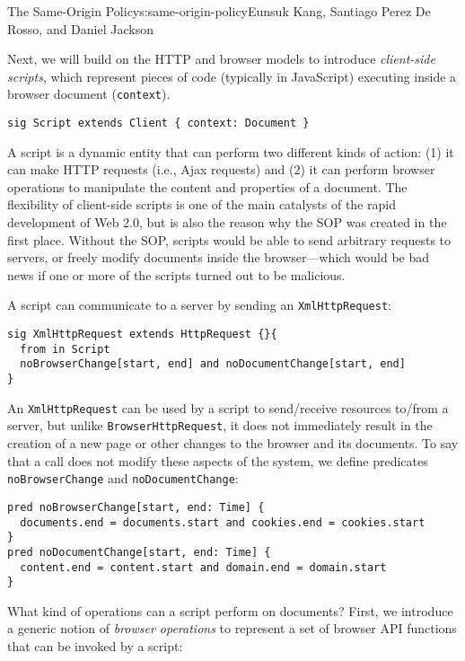 \begin{aosachapter}{The Same-Origin Policy}{s:same-origin-policy}{Eunsuk Kang, Santiago Perez De Rosso, and Daniel Jackson}
\label{script}

Next, we will build on the HTTP and browser models to introduce
\emph{client-side scripts}, which represent pieces of code (typically in
JavaScript) executing inside a browser document (\texttt{context}).

\begin{verbatim}
sig Script extends Client { context: Document }
\end{verbatim}

A script is a dynamic entity that can perform two different kinds of
action: (1) it can make HTTP requests (i.e., Ajax requests) and (2) it
can perform browser operations to manipulate the content and properties
of a document. The flexibility of client-side scripts is one of the main
catalysts of the rapid development of Web 2.0, but is also the reason
why the SOP was created in the first place. Without the SOP, scripts
would be able to send arbitrary requests to servers, or freely modify
documents inside the browser---which would be bad news if one or more of
the scripts turned out to be malicious.

A script can communicate to a server by sending an
\texttt{XmlHttpRequest}:

\begin{verbatim}
sig XmlHttpRequest extends HttpRequest {}{
  from in Script
  noBrowserChange[start, end] and noDocumentChange[start, end]
}
\end{verbatim}

An \texttt{XmlHttpRequest} can be used by a script to send/receive
resources to/from a server, but unlike \texttt{BrowserHttpRequest}, it
does not immediately result in the creation of a new page or other
changes to the browser and its documents. To say that a call does not
modify these aspects of the system, we define predicates
\texttt{noBrowserChange} and \texttt{noDocumentChange}:

\begin{verbatim}
pred noBrowserChange[start, end: Time] {
  documents.end = documents.start and cookies.end = cookies.start  
}
pred noDocumentChange[start, end: Time] {
  content.end = content.start and domain.end = domain.start  
}
\end{verbatim}

What kind of operations can a script perform on documents? First, we
introduce a generic notion of \emph{browser operations} to represent a
set of browser API functions that can be invoked by a script:


\end{aosachapter}
